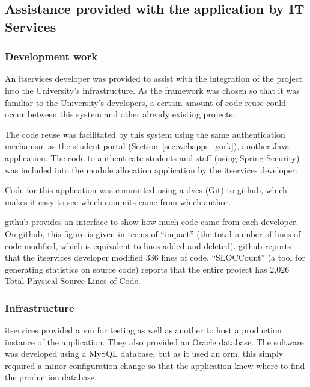 
\subsection{Assistance provided with the application by IT Services}

\subsubsection{Development work}

An \gls{itservices} developer was provided to assist with the integration of
the project into the University's infrastructure. As the framework was chosen
so that it was familiar to the University's developers, a certain amount of
code reuse could occur between this system and other already existing
projects.

The code reuse was facilitated by this system using the same authentication
mechanism as the student portal (Section~\ref{sec:webapps_york}), another Java
application. The code to authenticate students and staff (using Spring
Security) was included into the module allocation application by the
\gls{itservices} developer.

Code for this application was committed using a \gls{dvcs} (Git) to \gls{github},
which makes it easy to see which commits came from which author.

\gls{github} provides an interface to show how much code came from each
developer. On \gls{github}, this figure is given in terms of ``impact'' (the
total number of lines of code modified, which is equivalent to lines added and
deleted). \gls{github} reports that the \gls{itservices} developer modified
336 lines of code. \mbox{``SLOCCount''} \cite{SLOCCount} (a tool for
generating statistics on source code) reports that the entire project has
2,026 Total Physical Source Lines of Code.

\subsubsection{Infrastructure}

\gls{itservices} provided a \gls{vm} for testing as well as another to host a
production instance of the application. They also provided an Oracle database.
The software was developed using a MySQL database, but as it used an
\gls{orm}, this simply required a minor configuration change so that the
application knew where to find the production database.

